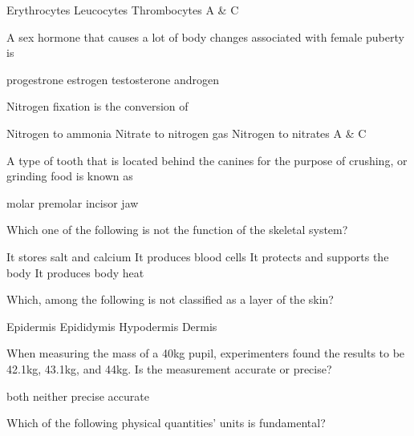 \documentclass[12pt,addpoints]{exam}
\begin{document}
{{{\begin{questions}
					\begin{oneparchoices}
						\choice Erythrocytes
						\choice Leucocytes
						\choice Thrombocytes
						\choice A \& C
					\end{oneparchoices}
					\question A sex hormone that causes a lot of body changes associated with female puberty is \\
					\begin{oneparchoices}
						\choice progestrone
						\choice estrogen
						\choice testosterone
						\choice androgen
					\end{oneparchoices}
					\question Nitrogen fixation is the conversion of 
					\begin{choices}
						\choice Nitrogen to ammonia
						\choice Nitrate to nitrogen gas
						\choice Nitrogen to nitrates
						\choice A \& C
					\end{choices}
					\question  A type of tooth that is located behind the canines for the purpose of crushing, or grinding food is known as \\
					\begin{oneparchoices}
						\choice molar
						\choice premolar
						\choice incisor
						\choice jaw
					\end{oneparchoices}
					\question Which one of the following is not the function of the skeletal system?
					\begin{choices}
						\choice It stores salt and calcium
						\choice It produces blood cells
						\choice It protects and supports the body
						\choice It produces body heat
					\end{choices}
					\question Which, among the following is not classified as a layer of the skin? \\
					\begin{oneparchoices}
						\choice Epidermis
						\choice Epididymis
						\choice Hypodermis
						\choice Dermis
					\end{oneparchoices}
					\question When measuring the mass of a 40kg pupil, experimenters found the results to be 42.1kg, 43.1kg, and 44kg. Is the measurement accurate or precise? \\
					\begin{oneparchoices}
						\choice both
						\choice neither
						\choice precise
						\choice accurate
					\end{oneparchoices}
					\question Which of the following physical quantities' units is fundamental? \\
					\begin{oneparchoices}

\end{oneparchoices}
\end{questions}}}}
\end{document}
